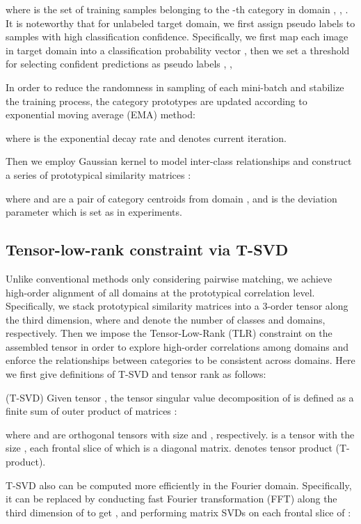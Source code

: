\documentclass[10pt,twocolumn,letterpaper]{article}
\begin{document}
where  is the set of training samples belonging to the -th category in domain , \ie, . It is noteworthy that for unlabeled target domain, we first assign pseudo labels  to samples with high classification confidence. Specifically, we first map each image in target domain  into a classification probability vector , then we set a threshold  for selecting confident predictions as pseudo labels , \ie,

\par
In order to reduce the randomness in sampling of each mini-batch and stabilize the training process, the category prototypes are updated according to exponential moving average (EMA) method:

where  is the exponential decay rate and  denotes current iteration. \par
Then we employ Gaussian kernel to model inter-class relationships and construct a series of prototypical similarity matrices : 
  
where  and  are a pair of category centroids from domain , and  is the deviation parameter which is set as  in experiments.\par 

\subsection{Tensor-low-rank constraint via T-SVD}
\label{sec3.2}
Unlike conventional methods only considering pairwise matching, we achieve high-order alignment of all domains at the prototypical correlation level. Specifically, we stack prototypical similarity matrices into a 3-order tensor  along the third dimension, where  and  denote the number of classes and domains, respectively. Then we impose the Tensor-Low-Rank (TLR) constraint on the assembled tensor in order to explore high-order correlations among domains and enforce the relationships between categories to be consistent across domains. Here we first give definitions of T-SVD and tensor rank as follows:\par
\begin{definition}
	(T-SVD) Given tensor , the tensor singular value decomposition of  is defined as a finite sum of outer product of matrices \cite{martin2013an}:
	
	where  and  are orthogonal tensors with size  and , respectively.  is a tensor with the size , each frontal slice of which is a diagonal matrix.  denotes tensor product (T-product). 
\end{definition}\par
T-SVD also can be computed more efficiently in the Fourier domain. Specifically, it can be replaced by conducting fast Fourier transformation (FFT) along the third dimension of  to get , and performing matrix SVDs on each frontal slice of :
\end{document}
